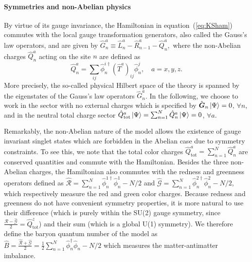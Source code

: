 \documentclass[twocolumn,aps,showpacs,prb,superscriptaddress,floatfix,10pt,nofootinbib]{revtex4-2}
\renewcommand{\eqref}[1]{equation~(\ref{#1})}
\begin{document}
\paragraph{\textbf{Symmetries and non-Abelian physics}}
By virtue of its gauge invariance, the Hamiltonian in \eqref{eq:KSham} commutes with the local gauge transformation generators, also called the Gauss's law operators, and are given by $\hat{G}_{n}^{a}\equiv \hat{L}_{n}^{a}-\hat{R}_{n-1}^{a}-\hat{Q}_{n}^{a},$ where the non-Abelian charges $\hat{Q}_{n}^{a}$ acting on the site $n$ are defined as
\begin{equation}
\hat{Q}_{n}^{a}=\sum_{ij}\hat{\phi}_{n}^{i\dagger}(\hat{T}^{a})_{ij}\hat{\phi}_{n}^{j}, \quad a=x,y,z. 
\label{nonabeliancharges}
\end{equation}   
More precisely, the so-called physical Hilbert space of the theory is spanned by the eigenstates of the Gauss's law operators $\hat{G}_{n}^{a}$. 
In the following, we choose to work in the sector with no external charges which is specified by $\hat{\boldsymbol{G}}_{n}\ket{\Psi}=0$, $\forall n$, and in the neutral total charge sector $\hat{Q}_{\text{tot}}^{a}\ket{\Psi}=\sum_{n=1}^{N}\hat{Q}_{n}^{a}\ket{\Psi}=0$, $\forall a$. 

Remarkably, the non-Abelian nature of the model allows the existence of gauge invariant singlet states which are forbidden in the Abelian case due to symmetry constraints. To see this, we note that the total color charges $\hat{Q}_{\text{tot}}^{a}=\sum_{n=1}^{N}\hat{Q}_{n}^{a}$ are conserved quantities and commute with the Hamiltonian.
Besides the three non-Abelian charges, the Hamiltonian also commutes with the redness and greenness operators defined as $\hat{\mathcal{R}} =\sum_{n=1}^{N} \hat{\phi}_{n}^{1 \dagger}\hat{\phi}_{n}^{1}-N/2$ and $\hat{\mathcal{G}} = \sum_{n=1}^{N}\hat{\phi}_{n}^{2 \dagger}\hat{\phi}_{n}^{2}-N/2$, which respectively measure the red and green color charges.
Because redness and greenness do not have convenient symmetry properties, it is more natural to use their difference (which is purely within the SU(2) gauge symmetry, since $\frac{\hat{\mathcal{R}} - \hat{\mathcal{G}}}{2} = \hat{Q}^{z}_{\text{tot}}$) and their sum (which is a global U(1) symmetry).
We therefore define the baryon quantum number of the model as 
$\hat{B} = \frac{\hat{\mathcal{R}}  + \hat{\mathcal{G}} }{2} = \frac{1}{2} \sum_{ n= 1}^{N} \hat{\phi}_{n}^{\dagger}\hat{\phi}_{n}-N/2$ which measures the matter-antimatter imbalance.
\end{document}
